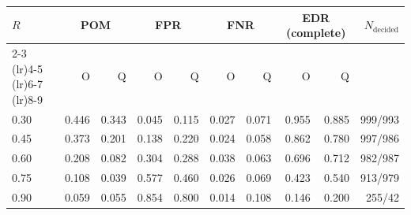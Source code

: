 \begin{tabular}{lrrrrrrrrr}
\toprule
\multirow{2}{*}{$R$} & \multicolumn{2}{c}{POM} & \multicolumn{2}{c}{FPR} & \multicolumn{2}{c}{FNR} & \multicolumn{2}{c}{EDR (complete)} & \multirow{2}{*}{$N_{\text{decided}}$} \\
\cmidrule(lr){2-3} \cmidrule(lr){4-5} \cmidrule(lr){6-7} \cmidrule(lr){8-9}
 & O & Q & O & Q & O & Q & O & Q & \\
\midrule
0.30 & 0.446 & 0.343 & 0.045 & 0.115 & 0.027 & 0.071 & 0.955 & 0.885 & 999/993 \\
0.45 & 0.373 & 0.201 & 0.138 & 0.220 & 0.024 & 0.058 & 0.862 & 0.780 & 997/986 \\
0.60 & 0.208 & 0.082 & 0.304 & 0.288 & 0.038 & 0.063 & 0.696 & 0.712 & 982/987 \\
0.75 & 0.108 & 0.039 & 0.577 & 0.460 & 0.026 & 0.069 & 0.423 & 0.540 & 913/979 \\
0.90 & 0.059 & 0.055 & 0.854 & 0.800 & 0.014 & 0.108 & 0.146 & 0.200 & 255/42 \\
\bottomrule
\end{tabular}
